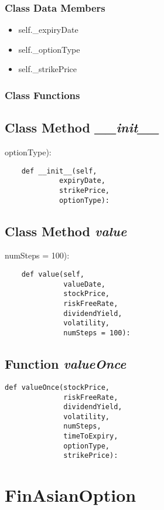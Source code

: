 \documentclass[twoside,11pt]{book}
\begin{document}
\subsubsection{Class Data Members}
\begin{itemize}
\item{self.\_expiryDate}
\item{self.\_optionType}
\item{self.\_strikePrice}
\end{itemize}

\subsubsection{Class Functions}

\subsection{Class Method {\it \_\_init\_\_}}
optionType):

\begin{lstlisting}
    def __init__(self,
             expiryDate,
             strikePrice,
             optionType):
\end{lstlisting}

\subsection{Class Method {\it value}}
numSteps = 100):

\begin{lstlisting}
    def value(self,
              valueDate,
              stockPrice,
              riskFreeRate,
              dividendYield,
              volatility,
              numSteps = 100):
\end{lstlisting}

\subsection{Function {\it valueOnce}}


\begin{lstlisting}
def valueOnce(stockPrice,
              riskFreeRate,
              dividendYield,
              volatility,
              numSteps,
              timeToExpiry,
              optionType,
              strikePrice):
\end{lstlisting}

\newpage
\section{FinAsianOption}
\end{document}
